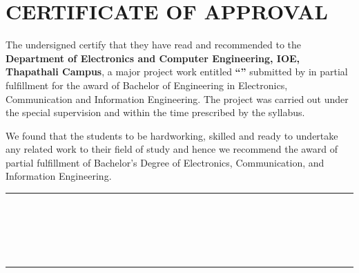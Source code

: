 \chapter*{CERTIFICATE OF APPROVAL}
{}

\noindent The undersigned certify that they have read and recommended to the
\textbf{Department of Electronics and Computer Engineering, IOE, Thapathali Campus},
a major project work entitled \textbf{``\cTitle''} submitted by
\textbf{\authorList} in partial fulfillment for the award of Bachelor of
Engineering in Electronics, Communication and Information Engineering.
The project was carried out under the special supervision and within the time
prescribed by the syllabus.

\vspace{1em}

We found that the students to be hardworking, skilled and ready to undertake
any related work to their field of study and hence we recommend the award of
partial fulfillment of Bachelor's Degree of Electronics, Communication, and
Information Engineering.

\vspace{2em}

\noindent
\begin{minipage}[t]{0.48\textwidth}
    \rule{6cm}{0.2mm} \\
    \cSupervisorTitle \\
    \cSupervisor \\
    \cSupervisorDept \\
    \cSupervisorAddress
\end{minipage}
\hfill
\begin{minipage}[t]{0.48\textwidth}
    \raggedright
    \rule{6cm}{0.2mm} \\
    \cExternalExaminerTitle \\
    \cExternalExaminer \\
    \cExternalExaminerDept \\
    \cExternalExaminerAddress
\end{minipage}

\vspace{3em}

